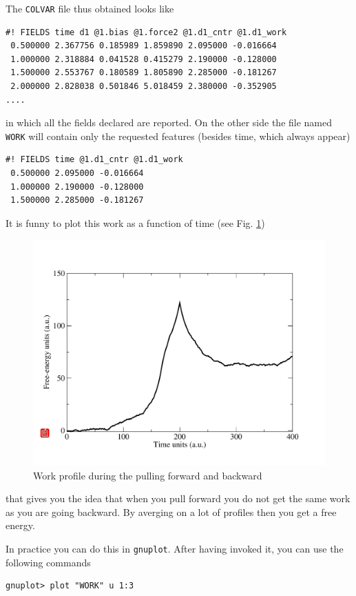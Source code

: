 \documentclass[10pt,fleqn,a4paper]{report}
\begin{document}
The \texttt{COLVAR} file thus obtained looks like
\begin{verbatim}
#! FIELDS time d1 @1.bias @1.force2 @1.d1_cntr @1.d1_work
 0.500000 2.367756 0.185989 1.859890 2.095000 -0.016664
 1.000000 2.318884 0.041528 0.415279 2.190000 -0.128000
 1.500000 2.553767 0.180589 1.805890 2.285000 -0.181267
 2.000000 2.828038 0.501846 5.018459 2.380000 -0.352905
....
\end{verbatim}
in which all the fields declared are reported.
On the other side the file named \texttt{WORK} will contain only the requested features 
(besides time, which always appear)
\begin{verbatim}
#! FIELDS time @1.d1_cntr @1.d1_work
 0.500000 2.095000 -0.016664
 1.000000 2.190000 -0.128000
 1.500000 2.285000 -0.181267
\end{verbatim}
It is funny to plot this work as a function of time (see Fig. \ref{work})
\begin{figure}[h!]
\begin{center}
\includegraphics[width=14cm,angle=0]{./figures/work}
\caption{Work profile during the pulling forward and backward}
\label{work}
\end{center}
\end{figure} 
that gives you the idea that when you pull forward you do not get the same work as you are going backward. By averging on a lot of profiles then you get a free energy.

In practice you can do this in \texttt{gnuplot}. After having invoked it, you can use the following commands
\begin{verbatim}
gnuplot> plot "WORK" u 1:3
\end{verbatim}
\end{document}
